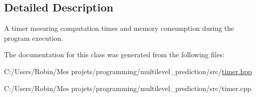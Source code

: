\subsection{Detailed Description}
A timer mesuring computation times and memory consumption during the program execution. 

The documentation for this class was generated from the following files\+:\begin{DoxyCompactItemize}
\item 
C\+:/\+Users/\+Robin/\+Mes projets/programming/multilevel\+\_\+prediction/src/\hyperlink{timer_8hpp}{timer.\+hpp}\item 
C\+:/\+Users/\+Robin/\+Mes projets/programming/multilevel\+\_\+prediction/src/timer.\+cpp\end{DoxyCompactItemize}
